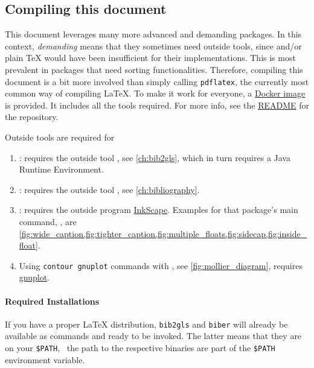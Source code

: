 \subsection*{Compiling this document}

This document leverages many more advanced and demanding packages.
In this context, \emph{demanding} means that they sometimes need outside tools,
since  and/or plain \TeX{} would have been insufficient for their
implementations.
This is most prevalent in packages that need sorting functionalities.
Therefore, compiling this document is a bit more involved than simply calling
\texttt{pdflatex}, the currently most common way of compiling \LaTeX{}.
To make it work for everyone, a
\href{https://hub.docker.com/repository/docker/alexpovel/latex}{Docker image}
is provided.
It includes all the tools required.
For more info, see the
\href{https://collaborating.tuhh.de/cap7863/latex-git-cookbook/-/blob/master/README.md}{README}
for the repository.

Outside tools are required for
\begin{enumerate}
    \item {}: requires the outside tool
        , see \cref{ch:bib2gls}, which in turn requires
        a Java Runtime Environment.
    \item {}: requires the outside tool ,
        see \cref{ch:bibliography}.
    \item {}: requires the outside program
        \href{https://inkscape.org/}{InkScape}.
        Examples for that package's main command, \verb||, are
        \cref{fig:wide_caption,fig:tighter_caption,fig:multiple_floats,fig:sidecap,fig:inside_float}.
    \item Using \texttt{contour gnuplot} commands with , see
        \cref{fig:mollier_diagram}, requires
        \href{http://www.gnuplot.info/download.html}{gnuplot}.
\end{enumerate}

\paragraph{Required Installations}
If you have a proper \LaTeX{} distribution, \texttt{bib2gls} and \texttt{biber}
will already be available as commands and ready to be invoked.
The latter means that they are on your \texttt{\$PATH}, \ the path to
the respective binaries are part of the \texttt{\$PATH} environment variable.


